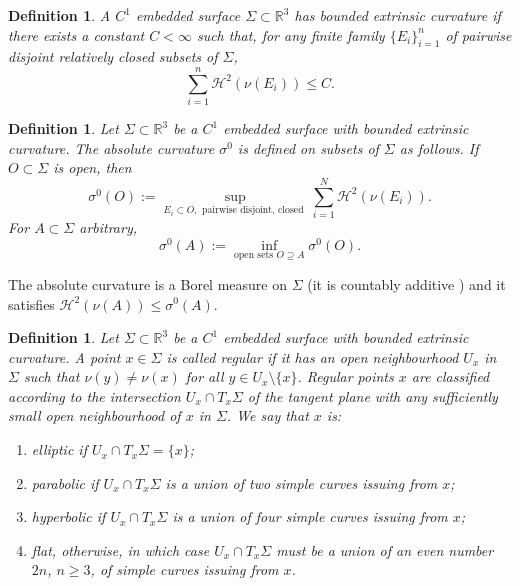 \documentclass[12pt]{article}
\newcommand{\R}{\mathbb{R}}
\theoremstyle{plain}
\newtheorem{definition}[theorem]{Definition}
\numberwithin{equation}{section}
\begin{document}
\begin{definition}
    A $C^1$ embedded surface $\Sigma \subset \R^3$ has bounded extrinsic curvature if there exists a constant $C < \infty$ such that, for any finite family $\{E_i\}_{i=1}^n$ of pairwise disjoint relatively closed subsets of $\Sigma$,
    \begin{equation*}
        \sum_{i=1}^n \mathcal{H}^2(\nu(E_i)) \leq C.
    \end{equation*}
\end{definition}
\begin{definition}
    Let $\Sigma \subset \R^3$ be a $C^1$ embedded surface with bounded extrinsic curvature. The absolute curvature $\sigma^0$ is defined on subsets of $\Sigma$ as follows. If $O \subset \Sigma$ is open, then
    \begin{equation*}
        \sigma^0(O):= \sup_{E_i \subset O, \text{ pairwise disjoint, closed } }  \sum_{i=1}^N \mathcal{H}^2(\nu(E_i)).
    \end{equation*}
    For $A \subset \Sigma$ arbitrary,
    \begin{equation*}
        \sigma^0(A) := \inf_{ \text{open sets } O \supseteq A} \sigma^0(O).
    \end{equation*}
\end{definition}
The absolute curvature is a Borel measure on $\Sigma$ (it is countably additive \cite[Theorem 2, p. 590]{pogorelov_73}) and it satisfies $\mathcal{H}^2(\nu(A)) \leq \sigma^0(A)$.
\begin{definition} \label{def:reg_pts}
    Let $\Sigma \subset \R^3$ be a $C^1$ embedded surface with bounded extrinsic curvature. A point $x \in \Sigma$ is called regular if it has an open neighbourhood $U_x$ in $\Sigma$ such that $\nu(y) \neq \nu(x)$ for all $y \in U_x \setminus \{x\}$. Regular points $x$ are classified according to the intersection $U_x \cap T_x \Sigma$ of the tangent plane with any sufficiently small open neighbourhood of $x$ in $\Sigma$. We say that $x$ is:
    \begin{enumerate}
        \item \textit{elliptic} if $U_x \cap T_x\Sigma = \{x\}$;
        \item \textit{parabolic} if $U_x \cap T_x \Sigma$ is a union of two simple curves issuing from $x$;
        \item \textit{hyperbolic} if $U_x \cap T_x\Sigma$ is a union of four simple curves issuing from $x$;
        \item \textit{flat}, otherwise, in which case $U_x \cap T_x \Sigma$ must be a union of an even number $2n$, $n \geq 3$, of simple curves issuing from $x$.
    \end{enumerate}
\end{definition}
\end{document}
